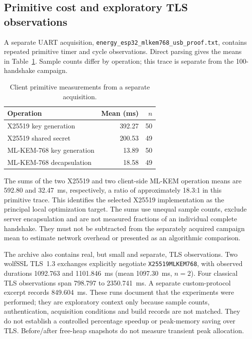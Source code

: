 \documentclass[pdflatex,sn-mathphys-num]{sn-jnl}
\begin{document}
\subsection{Primitive cost and exploratory TLS observations}
A separate UART acquisition, \texttt{energy\_esp32\_mlkem768\_usb\_proof.txt}, contains repeated primitive timer and cycle observations. Direct parsing gives the means in Table~\ref{tab:primitiveprofile}. Sample counts differ by operation; this trace is separate from the 100-handshake campaign.

\begin{table}[htbp]
\caption{Client primitive measurements from a separate acquisition.}
\label{tab:primitiveprofile}
\centering\small
\begin{tabular}{lrr}
\toprule
Operation & Mean (ms) & $n$\\
\midrule
X25519 key generation & 392.27 & 50\\
X25519 shared secret & 200.53 & 49\\
ML-KEM-768 key generation & 13.89 & 50\\
ML-KEM-768 decapsulation & 18.58 & 49\\
\bottomrule
\end{tabular}
\end{table}

The sums of the two X25519 and two client-side ML-KEM operation means are 592.80 and 32.47~ms, respectively, a ratio of approximately 18.3:1 in this primitive trace. This identifies the selected X25519 implementation as the principal local optimization target. The sums use unequal sample counts, exclude server encapsulation and are not measured fractions of an individual complete handshake. They must not be subtracted from the separately acquired campaign mean to estimate network overhead or presented as an algorithmic comparison.

The archive also contains real, but small and separate, TLS observations. Two wolfSSL TLS~1.3 exchanges explicitly negotiate \texttt{X25519MLKEM768}, with observed durations 1092.763 and 1101.846~ms (mean 1097.30~ms, $n=2$). Four classical TLS observations span 798.797 to 2350.741~ms. A separate custom-protocol excerpt records 849.604~ms. These runs document that the experiments were performed; they are exploratory context only because sample counts, authentication, acquisition conditions and build records are not matched. They do not establish a controlled percentage speedup or peak-memory saving over TLS. Before/after free-heap snapshots do not measure transient peak allocation.
\end{document}
